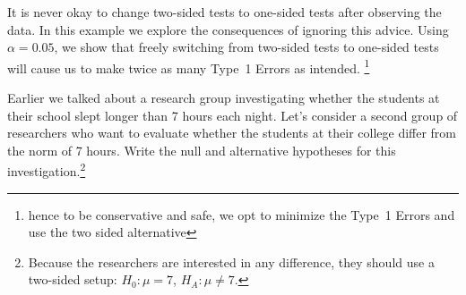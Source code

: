 It is never okay to change two-sided tests to one-sided tests after observing the data. In this example we explore the consequences of ignoring this advice. Using $\alpha=0.05$, we show that freely switching from two-sided tests to one-sided tests will cause us to make twice as many Type~1 Errors as intended. \footnote{hence to be conservative and safe, we opt to minimize the Type~1 Errors and use the two sided alternative}\label{swappingHypAfterDataDoublesType1ErrorRate}


\begin{exercise} \label{2ndSchSleepHypSetupExercise}
Earlier we talked about a research group investigating whether the students at their school slept longer than 7 hours each night. Let's consider a second group of researchers who want to evaluate whether the students at their college differ from the norm of 7 hours. Write the null and alternative hypotheses for this investigation.\footnote{Because the researchers are interested in any difference, they should use a two-sided setup: $H_0: \mu = 7$, $H_A: \mu \neq 7$.}
\end{exercise}

